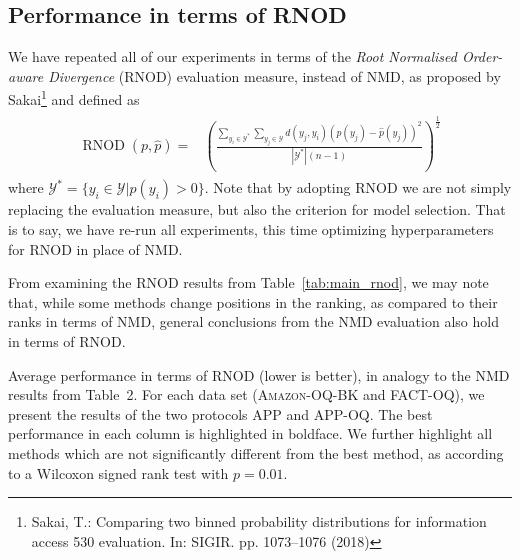 \documentclass[10pt,a4paper]{article}
\DeclareMathOperator{\rnod}{RNOD}
\begin{document}



\subsection{Performance in terms of RNOD}

\noindent We have repeated all of our experiments in terms of the
\emph{Root Normalised Order-aware Divergence} (RNOD) evaluation
measure, instead of NMD, as proposed
by Sakai\footnote{Sakai, T.: Comparing two binned probability distributions for information access 530 evaluation. In: SIGIR. pp. 1073–1076 (2018) }
and 
defined as
%
\begin{align}
 \begin{split}
 \label{eq:RNOD}
 \rnod(p,\hat{p}) = & \left(\frac{\sum_{y_{i}\in\mathcal{Y}^{*}}
 \sum_{y_{j}\in\mathcal{Y}}d(y_{j},y_{i})(p(y_{j})-\hat{p}(y_{j}))^{2}}{|\mathcal{Y}^{*}|(n-1)}\right)^{\frac{1}{2}}
 \end{split}
\end{align}
% 
\noindent where $\mathcal{Y}^{*}=\{y_{i}\in\mathcal{Y}|p(y_{i})>0\}$. Note that by adopting RNOD we are not simply replacing the evaluation measure, but also the criterion for model selection. That is to say, we have re-run all experiments, this time optimizing hyperparameters for RNOD in place of NMD.

From examining the RNOD results from Table~\ref{tab:main_rnod}, we may
note that, while some methods change positions in the ranking, as
compared to their ranks in terms of NMD, general conclusions from the
NMD evaluation also hold in terms of RNOD.

\begin{table}
 \centering
 \caption{Average performance in terms of RNOD (lower is better), in
 analogy to the NMD results from Table~2. For each data set
 (\textsc{Amazon-OQ-BK} and \textsc{FACT-OQ}), we present the results
 of the two protocols APP and \mbox{APP-OQ}. The best performance in
 each column is highlighted in boldface. We further highlight all
 methods which are not significantly different from the best method,
 as according to a Wilcoxon signed rank test with $p=0.01$.}
 \label{tab:main_rnod}
 \scriptsize 
\end{table}
\end{document}
